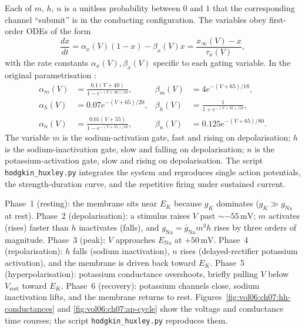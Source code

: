 Each of $m$, $h$, $n$ is a unitless
probability between $0$ and $1$ that the corresponding channel
``subunit'' is in the conducting configuration. The variables obey
first-order ODEs of the form
\begin{equation}
\frac{dx}{dt} = \alpha_x(V) (1 - x) - \beta_x(V) x = \frac{x_\infty(V) - x}{\tau_x(V)},
\label{eq:hh-gate}
\end{equation}
with the rate constants $\alpha_x(V), \beta_x(V)$ specific to each
gating variable. In the original parametrisation
\cite[p.~518]{paper:v6c07-hodgkin-huxley-1952}:
\begin{align*}
\alpha_m(V) &= \tfrac{0.1(V+40)}{1 - e^{-(V+40)/10}}, &
\beta_m(V) &= 4 e^{-(V+65)/18}, \\
\alpha_h(V) &= 0.07 e^{-(V+65)/20}, &
\beta_h(V) &= \tfrac{1}{1+e^{-(V+35)/10}}, \\
\alpha_n(V) &= \tfrac{0.01(V+55)}{1-e^{-(V+55)/10}}, &
\beta_n(V) &= 0.125 e^{-(V+65)/80}.
\end{align*}
The variable $m$ is the sodium-activation gate, fast and rising on
depolarisation; $h$ is the sodium-inactivation gate, slow and falling
on depolarisation; $n$ is the potassium-activation gate, slow and
rising on depolarisation. The script \verb|hodgkin_huxley.py|
integrates the system and reproduces single action potentials, the
strength-duration curve, and the repetitive firing under sustained
current.

 Phase~1 (resting): the membrane
sits near $E_K$ because $g_K$ dominates ($g_K \gg g_{\text{Na}}$ at
rest). Phase~2 (depolarisation): a stimulus raises $V$ past
$\sim -55\,\text{mV}$; $m$ activates (rises) faster than $h$
inactivates (falls), and $g_{\text{Na}} = \bar{g}_{\text{Na}} m^3 h$
rises by three orders of magnitude. Phase~3 (peak): $V$ approaches
$E_{\text{Na}}$ at $+50\,\text{mV}$. Phase~4 (repolarisation): $h$
falls (sodium inactivation), $n$ rises (delayed-rectifier potassium
activation), and the membrane is driven back toward $E_K$. Phase~5
(hyperpolarisation): potassium conductance overshoots, briefly pulling
$V$ below $V_{\text{rest}}$ toward $E_K$. Phase~6 (recovery):
potassium channels close, sodium inactivation lifts, and the membrane
returns to rest. Figures~\ref{fig:vol06:ch07:hh-conductances} and
\ref{fig:vol06:ch07:ap-cycle} show the voltage and conductance time
courses; the script \verb|hodgkin_huxley.py| reproduces them.



